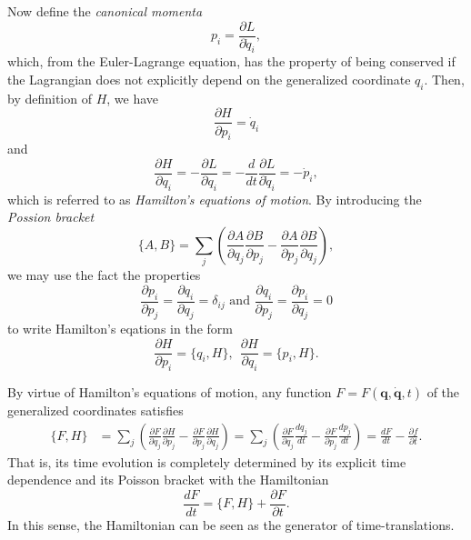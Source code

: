 \documentclass[twoside,utf8]{article}
\begin{document}
Now define the {\it canonical momenta}
\[
p_i = \frac{\partial L}{\partial \dot{q}_i},
\]
which, from the Euler-Lagrange equation, has the property of being conserved if the Lagrangian does not explicitly depend on the generalized coordinate $q_i$. Then, by definition of $H$, we have
\[
\frac{\partial H}{\partial p_i} = \dot{q}_i
\]
and
\[
\frac{\partial H}{\partial q_i}
= -\frac{\partial L}{\partial q_i}
= -\frac{d}{dt}\frac{\partial L}{\partial \dot{q}_i}
= -\dot{p}_i,
\]
which is referred to as {\it Hamilton's equations of motion}. By introducing the {\it Possion bracket}
\[
\{A,B\}=\sum_j \left( \frac{\partial A}{\partial q_j} \frac{\partial B}{\partial p_j} - \frac{\partial A}{\partial p_j} \frac{\partial B}{\partial q_j} \right),
\]
we may use the fact the properties
\[
\frac{\partial p_i}{\partial p_j} = \frac{\partial q_i}{\partial q_j} = \delta_{ij}
\text{ and }
\frac{\partial q_i}{\partial p_j} = \frac{\partial p_i}{\partial q_j} = 0
\]
to write Hamilton's eqations in the form
\[
\frac{\partial H}{\partial p_i} = \{q_i,H\}, \ \
\frac{\partial H}{\partial q_i} = \{p_i,H\}.
\]

By virtue of Hamilton's equations of motion, any function $F=F(\mathbf{q},\dot{\mathbf{q}},t)$ of the generalized coordinates satisfies
\begin{equation*}
\begin{aligned}
\{F,H\}
&= \sum_j\left(
  \frac{\partial F}{\partial q_j} \frac{\partial H}{\partial p_j}
- \frac{\partial F}{\partial p_j} \frac{\partial H}{\partial q_j}
\right)
=
\sum_j\left(
  \frac{\partial F}{\partial q_j} \frac{d q_j}{dt}
- \frac{\partial F}{\partial p_j} \frac{d p_j}{dt}
\right)
=
\frac{dF}{dt}-\frac{\partial f}{\partial t}.
\end{aligned}
\end{equation*}
That is, its time evolution is completely determined by its explicit time dependence and its Poisson bracket with the Hamiltonian
\[
\frac{dF}{dt}=\{F,H\}+\frac{\partial F}{\partial t}.
\]
In this sense, the Hamiltonian can be seen as the generator of time-translations.
\end{document}
